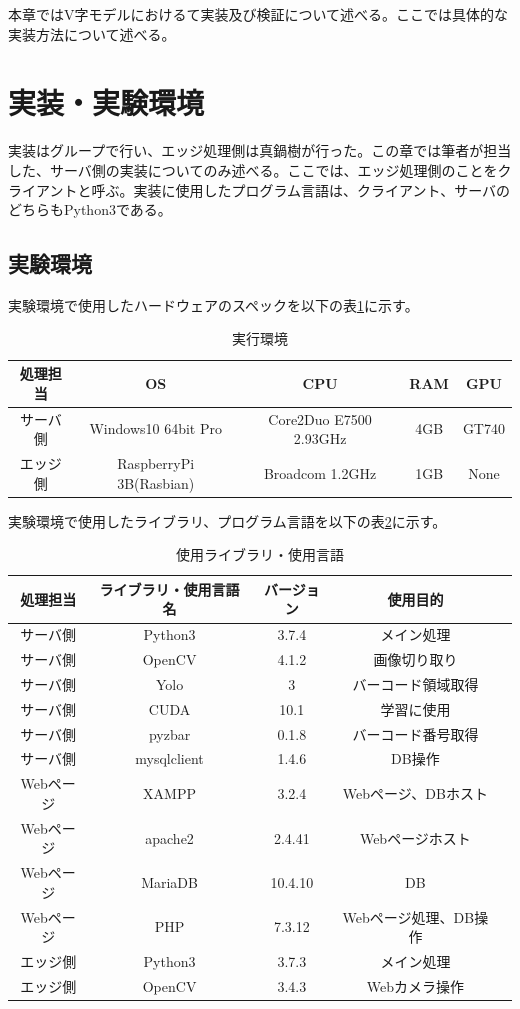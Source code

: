 本章ではV字モデルにおけるて実装及び検証について述べる。ここでは具体的な実装方法について述べる。
\section{実装・実験環境}
実装はグループで行い、エッジ処理側は真鍋樹が行った。この章では筆者が担当した、サーバ側の実装についてのみ述べる。ここでは、エッジ処理側のことをクライアントと呼ぶ。実装に使用したプログラム言語は、クライアント、サーバのどちらもPython3である。


\subsection*{実験環境}
実験環境で使用したハードウェアのスペックを以下の表\ref{spec}に示す。
\begin{table}[htb]
\begin{center}
\caption{実行環境}
\begin{tabular}{|c|c|c|c|c|} \hline
処理担当 & OS & CPU & RAM & GPU \\ \hline
サーバ側 & Windows10 64bit Pro & Core2Duo E7500 2.93GHz & 4GB & GT740 \\ \hline
エッジ側 & RaspberryPi 3B(Rasbian) & Broadcom 1.2GHz & 1GB & None \\ \hline
\end{tabular}
\label{spec}
	\end{center}
\end{table}


実験環境で使用したライブラリ、プログラム言語を以下の表\ref{library_spec}に示す。
\begin{table}[htb]
\begin{center}
\caption{使用ライブラリ・使用言語}
\begin{tabular}{|c|c|c|c|c|} \hline
処理担当 & ライブラリ・使用言語名 & バージョン & 使用目的 \\ \hline \hline
サーバ側 & Python3 & 3.7.4 & メイン処理	\\ \hline
サーバ側 & OpenCV & 4.1.2 & 画像切り取り\\ \hline
サーバ側 & Yolo & 3 & バーコード領域取得\\ \hline
サーバ側 & CUDA & 10.1 & 学習に使用\\ \hline
サーバ側 & pyzbar & 0.1.8 & バーコード番号取得\\ \hline
サーバ側 & mysqlclient & 1.4.6 & DB操作\\ \hline \hline
Webページ & XAMPP & 3.2.4 & Webページ、DBホスト\\ \hline
Webページ & apache2 & 2.4.41 & Webページホスト\\ \hline
Webページ & MariaDB & 10.4.10 & DB\\ \hline
Webページ & PHP & 7.3.12 & Webページ処理、DB操作\\ \hline \hline
エッジ側 & Python3 & 3.7.3 & メイン処理		\\ \hline
エッジ側 & OpenCV & 3.4.3 & Webカメラ操作\\ \hline
\end{tabular}
\label{library_spec}
	\end{center}
\end{table}


